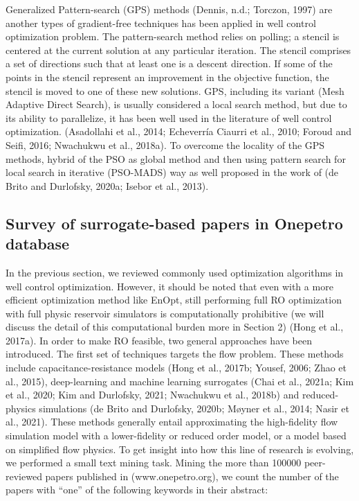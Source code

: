 \documentclass[]{elsarticle} %
\begin{document}
Generalized Pattern-search (GPS) methods (Dennis, n.d.; Torczon, 1997) are another types of gradient-free techniques has been applied in well control optimization problem. The pattern-search method relies on polling; a stencil is centered at the current solution at any particular iteration. The stencil comprises a set of directions such that at least one is a descent direction. If some of the points in the stencil represent an improvement in the objective function, the stencil is moved to one of these new solutions. GPS, including its variant (Mesh Adaptive Direct Search), is usually considered a local search method, but due to its ability to parallelize, it has been well used in the literature of well control optimization. (Asadollahi et al., 2014; Echeverría Ciaurri et al., 2010; Foroud and Seifi, 2016; Nwachukwu et al., 2018a). To overcome the locality of the GPS methods, hybrid of the PSO as global method and then using pattern search for local search in iterative (PSO-MADS) way as well proposed in the work of (de Brito and Durlofsky, 2020a; Isebor et al., 2013).

\hypertarget{survey-of-surrogate-based-papers-in-onepetro-database}{%
\subsection{Survey of surrogate-based papers in Onepetro database}\label{survey-of-surrogate-based-papers-in-onepetro-database}}

In the previous section, we reviewed commonly used optimization algorithms in well control optimization. However, it should be noted that even with a more efficient optimization method like EnOpt, still performing full RO optimization with full physic reservoir simulators is computationally prohibitive (we will discuss the detail of this computational burden more in Section 2) (Hong et al., 2017a). In order to make RO feasible, two general approaches have been introduced. The first set of techniques targets the flow problem. These methods include capacitance-resistance models (Hong et al., 2017b; Yousef, 2006; Zhao et al., 2015), deep-learning and machine learning surrogates (Chai et al., 2021a; Kim et al., 2020; Kim and Durlofsky, 2021; Nwachukwu et al., 2018b) and reduced-physics simulations (de Brito and Durlofsky, 2020b; Møyner et al., 2014; Nasir et al., 2021). These methods generally entail approximating the high-fidelity flow simulation model with a lower-fidelity or reduced order model, or a model based on simplified flow physics. To get insight into how this line of research is evolving, we performed a small text mining task. Mining the more than 100000 peer-reviewed papers published in (www.onepetro.org), we count the number of the papers with ``one'' of the following keywords in their abstract:
\end{document}
